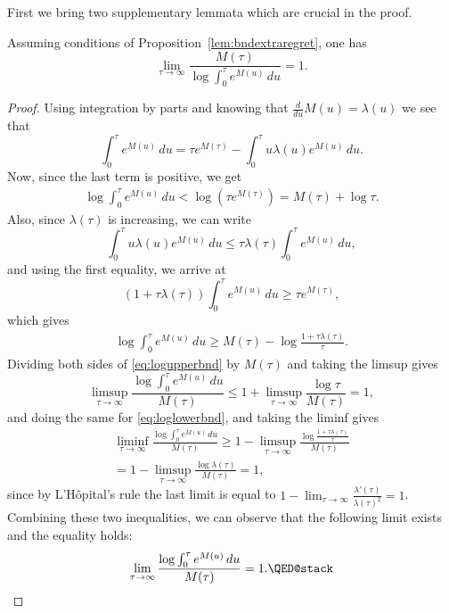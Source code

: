 First we bring two supplementary lemmata which are crucial in the proof.
\begin{lemma}\label{lem:suppl1}
  Assuming conditions of Proposition~\ref{lem:bndextraregret}, one has
  \[
    \lim_{\tau\to\infty} \frac{M(\tau)}{\log \int_0^\tau e^{M(u)}\,du} = 1.
  \]
\end{lemma}
\begin{proof}
  Using integration by parts and knowing that $\frac{d}{du}M(u) = \lambda(u)$ we see that
  \[
    \int_0^\tau e^{M(u)}\,du = \tau e^{M(\tau)} - \int_0^\tau u\lambda(u)e^{M(u)}\,du.
  \]
  Now, since the last term is positive, we get
  \begin{align}\label{eq:logupperbnd}
    \log\int_0^\tau e^{M(u)}\,du < \log(\tau e^{M(\tau)}) = M(\tau) + \log \tau.
  \end{align}
  Also, since $\lambda(\tau)$ is increasing, we can write 
  \[
    \int_0^\tau u\lambda(u) e^{M(u)}\,du \leq \tau\lambda(\tau) \int_0^\tau e^{M(u)}\,du,
  \]
  and using the first equality, we arrive at
  \[
    (1 + \tau\lambda(\tau)) \int_0^\tau e^{M(u)}\,du \geq \tau e^{M(\tau)},
  \]
  which gives
  \begin{align}\label{eq:loglowerbnd}
    \log \int_0^\tau e^{M(u)}\,du \geq M(\tau) - \log\frac{1 + \tau\lambda(\tau)}{\tau}.
  \end{align}
  Dividing both sides of \eqref{eq:logupperbnd} by $M(\tau)$ and taking the limsup gives
  \[
    \limsup_{\tau\to\infty} \frac{\log \int_0^\tau e^{M(u)}\,du}{M(\tau)} \leq 1 + \limsup_{\tau\to\infty} \frac{\log \tau}{M(\tau)} = 1, 
  \]
  and doing the same for \eqref{eq:loglowerbnd}, and taking the liminf gives
  \begin{align*}
    \liminf_{\tau\to\infty} \frac{\log \int_0^\tau e^{M(u)}\,du}{M(\tau)} \geq 1 - \limsup_{\tau\to\infty} \frac{\log\frac{1 + \tau\lambda(\tau)}{\tau}}{M(\tau)} \\
    = 1 - \limsup_{\tau\to\infty} \frac{\log\lambda(\tau)}{M(\tau)} = 1, 
  \end{align*}
  since by L'H\^{o}pital's rule the last limit is equal to $1 - \lim_{\tau\to\infty} \frac{\lambda'(\tau)}{\lambda(\tau)^2} = 1$.
  Combining these two inequalities, we can observe that the following limit exists and the equality holds:
  \[
    \lim_{\tau\to\infty} \frac{\log \int_0^\tau e^{M(u)}\,du}{M(\tau)}= 1. \qedhere
  \]
\end{proof}

